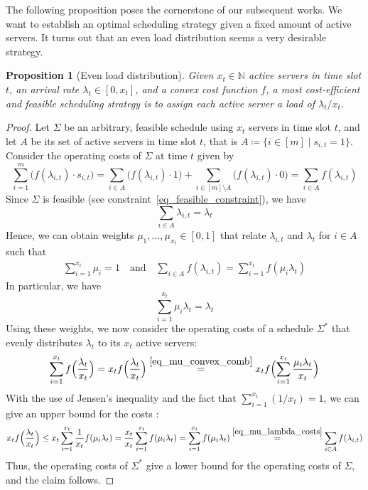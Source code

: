 \documentclass[hidelinks]{article}
\theoremstyle{plain}
\newtheorem{prop}[thm]{Proposition}
\theoremstyle{definition}
\theoremstyle{rem}
\begin{document}
The following proposition poses the cornerstone of our subsequent works. We want to establish an optimal scheduling strategy given a fixed amount of active servers. It turns out that an even load distribution seems a very desirable strategy.
\begin{prop}[Even load distribution]\label{prop_even_load_distribution}
Given $x_t\in\mathbb{N}$ active servers in time slot $t$, an arrival rate $\lambda_t\in[0,x_t]$, and a convex cost function $f$, a most cost-efficient and feasible scheduling strategy is to assign each active server a load of $\lambda_t/x_t$.
\end{prop}
\begin{proof}
Let $\Sigma$ be an arbitrary, feasible schedule using $x_t$ servers in time slot $t$, and let $A$ be its set of active servers in time slot $t$, that is $A\coloneqq\{i\in[m]\mid s_{i,t}=1\}$.
Consider the operating costs of $\Sigma$ at time $t$ given by
\begin{equation*}
	\sum\limits_{i=1}^{m}\bigl(f(\lambda_{i,t})\cdot s_{i,t}\bigr)=\sum\limits_{i\in A}\bigl(f(\lambda_{i,t})\cdot1\bigr)+\sum\limits_{i\in [m]\setminus A}\bigl(f(\lambda_{i,t})\cdot0\bigr)=\sum\limits_{i\in A}f(\lambda_{i,t})
\end{equation*}
Since $\Sigma$ is feasible (see constraint~\eqref{eq_feasible_constraint}), we have 
\begin{equation*}
	\sum\limits_{i\in A}\lambda_{i,t}=\lambda_t
\end{equation*}
Hence, we can obtain weights $\mu_1,\ldots,\mu_{x_t}\in[0,1]$ that relate $\lambda_{i,t}$ and $\lambda_t$ for $i\in A$ such that
\begin{align}
	\sum\limits_{i=1}^{x_t}\mu_i=1\quad\text{and}\quad \sum\limits_{i\in A}f(\lambda_{i,t})=\sum\limits_{i=1}^{x_t}f(\mu_i\lambda_t)\label{eq_mu_lambda_costs}
\end{align}
In particular, we have 
\begin{equation}
	\sum_{i=1}^{x_t}\mu_i\lambda_t=\lambda_t\label{eq_mu_convex_comb}
\end{equation}
Using these weights, we now consider the operating costs of a schedule $\Sigma^*$ that evenly distributes $\lambda_t$ to its $x_t$ active servers:
\begin{align*}
	\sum\limits_{i=1}^{x_t}f\Bigl(\frac{\lambda_t}{x_t}\Bigr)=x_tf\Bigl(\frac{\lambda_t}{x_t}\Bigr)\stackrel{\eqref{eq_mu_convex_comb}}{=}x_tf\Bigl(\sum\limits_{i=1}^{x_t}{\frac{\mu_i\lambda_t}{x_t}}\Bigr)
\end{align*}
With the use of Jensen's inequality and the fact that $\sum_{i=1}^{x_t}(1/x_t)=1$, we can give an upper bound for the costs :
\begin{align*}
	x_tf\Bigl(\frac{\lambda_t}{x_t}\Bigr)\le x_t\sum\limits_{i=1}^{x_t}\frac{1}{x_t}f(\mu_i\lambda_t)=\frac{x_t}{x_t}\sum\limits_{i=1}^{x_t}f(\mu_i\lambda_t)=\sum\limits_{i=1}^{x_t}f(\mu_i\lambda_t)\stackrel{\eqref{eq_mu_lambda_costs}}{=}\sum\limits_{i\in A}f(\lambda_{i,t})
\end{align*}
Thus, the operating costs of $\Sigma^*$ give a lower bound for the operating costs of $\Sigma$, and the claim follows.
\end{proof}
\end{document}
